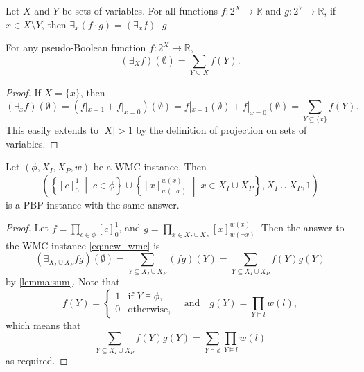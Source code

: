 \documentclass[runningheads]{llncs}
\begin{document}
\begin{theorem} \label{thm:early}
  Let $X$ and $Y$ be sets of variables. For all functions $f\colon 2^X \to
  \mathbb{R}$ and $g\colon 2^Y \to \mathbb{R}$, if $x \in X \setminus Y$, then
  $\exists_x (f \cdot g) = (\exists_x f) \cdot g$.
\end{theorem}

\begin{lemma} \label{lemma:sum}
  For any pseudo-Boolean function $f\colon 2^X \to \mathbb{R}$,
  \[
    (\exists_X f)(\emptyset) = \sum_{Y \subseteq X} f(Y).
  \]
\end{lemma}
\begin{proof}
  If $X = \{x\}$, then
  \[
    (\exists_xf)(\emptyset) = (f|_{x=1} + f|_{x=0})(\emptyset) =
    f|_{x=1}(\emptyset) + f|_{x=0}(\emptyset) = \sum_{Y \subseteq \{x\}} f(Y).
  \]
  This easily extends to $|X| > 1$ by the definition of projection on sets of
  variables.
\end{proof}

\begin{proposition} \label{prop:equivalence}
  Let $(\phi, X_I, X_P, w)$ be a WMC instance. Then
  \begin{equation}
  \left(\left\{[c]_0^1 \;\middle|\; c \in \phi\right\} \cup \left\{[x]_{w(\neg
        x)}^{w(x)} \;\middle|\; x \in X_I \cup X_P\right\}, X_I \cup X_P,
    1\right) \label{eq:new_wmc}
  \end{equation}
  is a PBP instance with the same answer.
\end{proposition}
\begin{proof}
  Let $f = \prod_{c \in \phi} [c]_0^1$, and $g = \prod_{x \in X_I \cup X_P}
  [x]_{w(\neg x)}^{w(x)}$. Then the answer to the WMC instance
  \eqref{eq:new_wmc} is
  \[
    (\exists_{X_I \cup X_P} fg)(\emptyset) = \sum_{Y \subseteq X_I \cup X_P}
    (fg)(Y) = \sum_{Y \subseteq X_I \cup X_P} f(Y)g(Y)
  \]
  by \cref{lemma:sum}. Note that
  \[
    f(Y) =
    \begin{cases}
      1 & \text{if } Y \models \phi, \\
      0 & \text{otherwise},
    \end{cases}
    \quad
    \text{and}
    \quad
    g(Y) = \prod_{Y \models l} w(l),
  \]
  which means that
  \[
    \sum_{Y \subseteq X_I \cup X_P} f(Y)g(Y) = \sum_{Y \models \phi} \prod_{Y
      \models l} w(l)
  \]
  as required.
\end{proof}
\end{document}
